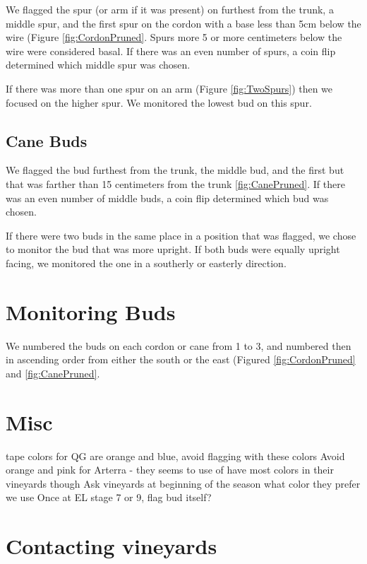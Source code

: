 \documentclass[11pt,letter]{article}
\begin{document}
We flagged the spur (or arm if it was present) on furthest from the trunk, a middle spur, and the first spur on the cordon with a base less than 5cm below the wire (Figure \ref{fig:CordonPruned}. Spurs more 5 or more centimeters below the wire were considered basal. If there was an even number of spurs, a coin flip determined which middle spur was chosen.

If there was more than one spur on an arm (Figure \ref{fig:TwoSpurs}) then we focused on the higher spur. We monitored the lowest bud on this spur. 

\subsection{Cane Buds}

We flagged the bud furthest from the trunk, the middle bud, and the first but that was farther than 15 centimeters from the trunk \ref{fig:CanePruned}. If there was an even number of middle buds, a coin flip determined which bud was chosen. 

If there were two buds in the same place in a position that was flagged, we chose to monitor the bud that was more upright. If both buds were equally upright facing, we monitored the one in a southerly or easterly direction. 

\section{Monitoring Buds}
We numbered the buds on each cordon or cane from 1 to 3, and numbered then in ascending order from either the south or the east (Figured \ref{fig:CordonPruned} and \ref{fig:CanePruned}. 

\section{Misc}
tape colors for QG are orange and blue, avoid flagging with these colors
Avoid orange and pink for Arterra - they seems to use of have most colors in their vineyards though
Ask vineyards at beginning of the season what color they prefer we use
Once at EL stage 7 or 9, flag bud itself?

\section{Contacting vineyards}
\end{document}
